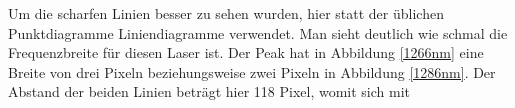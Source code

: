 \begin{figure}[H]
	\begin{center}
		\label{kalib}
	\end{center}
\end{figure}
Um die scharfen Linien besser zu sehen wurden, hier statt der üblichen Punktdiagramme Liniendiagramme verwendet. Man sieht deutlich wie schmal die Frequenzbreite für diesen Laser ist. Der Peak hat in Abbildung \ref{1266nm} eine Breite von drei Pixeln beziehungsweise zwei Pixeln in Abbildung \ref{1286nm}. Der Abstand der beiden Linien beträgt hier 118 Pixel, womit sich mit 

